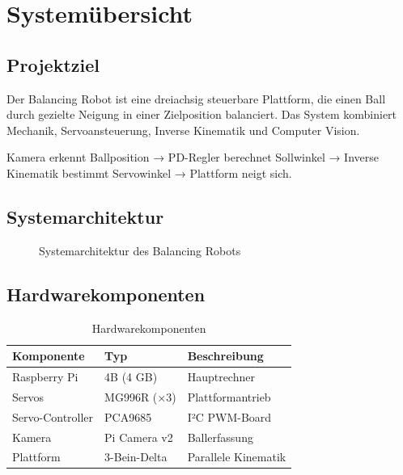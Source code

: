 \documentclass[11pt, a4paper, twoside=false, openany]{scrbook}
\begin{document}
\chapter{Systemübersicht}

\section{Projektziel}

Der Balancing Robot ist eine dreiachsig steuerbare Plattform, die einen Ball
durch gezielte Neigung in einer Zielposition balanciert. Das System kombiniert
Mechanik, Servoansteuerung, Inverse Kinematik und Computer Vision.

\begin{infobox}[Kernfunktion]
  Kamera erkennt Ballposition → PD-Regler berechnet Sollwinkel →
  Inverse Kinematik bestimmt Servowinkel → Plattform neigt sich.
\end{infobox}

\section{Systemarchitektur}

\begin{figure}[h]
  \centering
  \caption{Systemarchitektur des Balancing Robots}
\end{figure}

\section{Hardwarekomponenten}

\begin{table}[h]
  \centering
  \begin{tabular}{lll}
    \toprule
    \textbf{Komponente} & \textbf{Typ} & \textbf{Beschreibung} \\
    \midrule
    Raspberry Pi     & 4B (4 GB)       & Hauptrechner \\
    Servos           & MG996R (×3)     & Plattformantrieb \\
    Servo-Controller & PCA9685         & I²C PWM-Board \\
    Kamera           & Pi Camera v2    & Ballerfassung \\
    Plattform        & 3-Bein-Delta    & Parallele Kinematik \\
    \bottomrule
  \end{tabular}
  \caption{Hardwarekomponenten}
\end{table}
\end{document}
